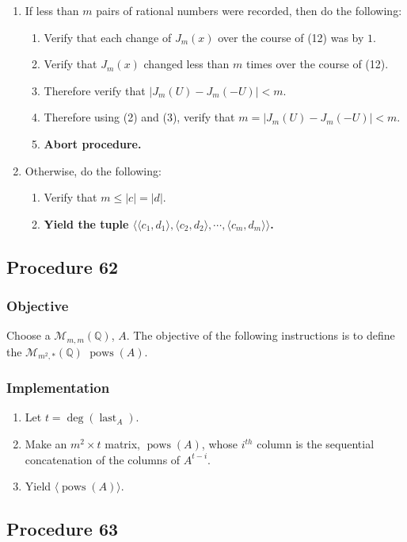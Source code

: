 \documentclass[twocolumn]{article}
\DeclareMathOperator{\pows}{pows}
\DeclareMathOperator{\last}{last}
\begin{document}
\begin{enumerate}
					\item If less than $m$ pairs of rational numbers were recorded, then do the following:
					\begin{enumerate}
						\item Verify that each change of $J_m(x)$ over the course of (12) was by $1$.
						\item Verify that $J_m(x)$ changed less than $m$ times over the course of (12).
						\item Therefore verify that $\lvert J_m(U)-J_m(-U)\rvert<m$.
						\item Therefore using (2) and (3), verify that $m=\lvert J_m(U)-J_m(-U)\rvert<m$.
						\item \textbf{Abort procedure.}
					\end{enumerate}
					\item Otherwise, do the following:
					\begin{enumerate}
						\item Verify that $m\le\lvert c\rvert=\lvert d\rvert$.
						\item \textbf{Yield the tuple $\langle\langle c_1,d_1\rangle,\langle c_2,d_2\rangle,\cdots,\langle c_m,d_m\rangle\rangle$.}
					\end{enumerate}
				\end{enumerate}
		\subsection{Procedure 62}\label{sec:procedure 62}
			\subsubsection{Objective}
				Choose a $\mathcal{M}_{m,m}(\mathbb{Q})$, $A$. The objective of the following instructions is to define the $\mathcal{M}_{m^2,*}(\mathbb{Q})$ $\pows(A)$.
			\subsubsection{Implementation}
				\begin{enumerate}
					\item Let $t=\deg(\last_A)$.
					\item Make an $m^2\times t$ matrix, $\pows(A)$, whose $i^{th}$ column is the sequential concatenation of the columns of $A^{t-i}$.
					\item Yield $\langle\pows(A)\rangle$.
				\end{enumerate}
		\subsection{Procedure 63}\label{sec:procedure 63}
\end{document}
